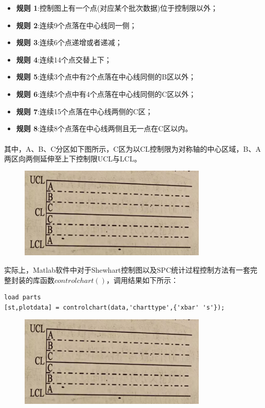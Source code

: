 \documentclass[12pt]{article}  %
\newcommand{\upcite}[1]{\textsuperscript{\textsuperscript{\cite{#1}}}}
\begin{document}
\begin{itemize}
	\setlength{\parsep}{0ex} %
	\setlength{\topsep}{2ex} %
	\setlength{\itemsep}{1ex} %
	\item \textbf{规则 1}:控制图上有一个点(对应某个批次数据)位于控制限以外；		
	\item \textbf{规则 2}:连续9个点落在中心线同一侧；
	\item \textbf{规则 3}:连续6个点递增或者递减；
	\item \textbf{规则 4}:连续14个点交替上下；
	\item \textbf{规则 5}:连续3个点中有2个点落在中心线同侧的B区以外；
	\item \textbf{规则 6}:连续5个点中有4个点落在中心线同侧的C区以外；
	\item \textbf{规则 7}:连续15个点落在中心线两侧的C区；
	\item \textbf{规则 8}:连续8个点落在中心线两侧且无一点在C区以内。
\end{itemize}

其中，A、B、C分区如下图\upcite{2}所示，C区为以CL控制限为对称轴的中心区域，B、A两区向两侧延伸至上下控制限UCL与LCL。

\begin{figure}[H]
	\centering
	\includegraphics[width=0.8\textwidth]{5.png}
\end{figure}

实际上，Matlab软件中对于Shewhart控制图以及SPC统计过程控制方法有一套完整封装的库函数$controlchart()$，调用结果如下所示：

\begin{lstlisting}
load parts
[st,plotdata] = controlchart(data,'charttype',{'xbar' 's'});
\end{lstlisting}

\begin{figure}[H]
	\centering
	\includegraphics[width=0.8\textwidth]{5.png}
\end{figure}
\end{document}
